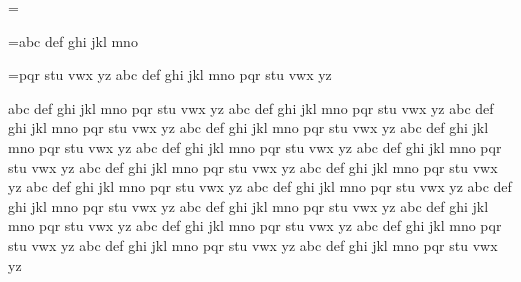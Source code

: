 
\tracingall
{}

\newbox\collectbox

\collectbox=\vbox{}

\collectbox=\vbox{\unvcopy\collectbox abc def ghi jkl mno}

\unvcopy\collectbox

\vskip1in

\collectbox=\vbox{\unvcopy\collectbox pqr stu vwx yz abc def ghi jkl mno pqr stu vwx yz}

\unvcopy\collectbox


\bye


abc def ghi jkl mno pqr stu vwx yz abc def ghi jkl mno pqr stu vwx yz
abc def ghi jkl mno pqr stu vwx yz abc def ghi jkl mno pqr stu vwx yz
abc def ghi jkl mno pqr stu vwx yz abc def ghi jkl mno pqr stu vwx yz
abc def ghi jkl mno pqr stu vwx yz abc def ghi jkl mno pqr stu vwx yz
abc def ghi jkl mno pqr stu vwx yz abc def ghi jkl mno pqr stu vwx yz
abc def ghi jkl mno pqr stu vwx yz abc def ghi jkl mno pqr stu vwx yz
abc def ghi jkl mno pqr stu vwx yz abc def ghi jkl mno pqr stu vwx yz
abc def ghi jkl mno pqr stu vwx yz abc def ghi jkl mno pqr stu vwx yz
abc def ghi jkl mno pqr stu vwx yz abc def ghi jkl mno pqr stu vwx yz




\bye


